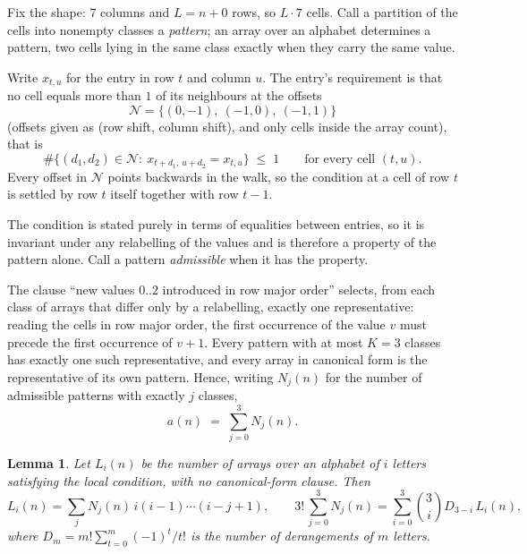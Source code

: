 \documentclass[11pt,a4paper]{article}
\theoremstyle{plain}
\newtheorem{lemma}[theorem]{Lemma}
\theoremstyle{definition}
\begin{document}
Fix the shape: $7$ columns and $L=n+0$ rows, so $L\cdot7$ cells. Call a
partition of the cells into nonempty classes a \emph{pattern}; an array over an alphabet
determines a pattern, two cells lying in the same class exactly when they carry the same
value.

Write $x_{t,u}$ for the entry in row $t$ and column $u$. The
entry's requirement is that no cell equals more than $1$ of its neighbours at the
offsets
\[
\mathcal N=\{(0,-1),\ (-1,0),\ (-1,1)\}
\]
(offsets given as (row shift, column shift), and only cells inside the array count),
that is
\begin{equation}\label{eq:loc}
\#\bigl\{(d_1,d_2)\in\mathcal N:\ x_{t+d_1,\,u+d_2}=x_{t,u}\bigr\}\;\le\;1
\qquad\text{for every cell }(t,u).
\end{equation}
Every offset in $\mathcal N$ points backwards in the walk, so the condition at a cell of
row $t$ is settled by row $t$ itself together with row $t-1$.

The condition is stated purely in terms of equalities between entries, so it is invariant
under any relabelling of the values and is therefore a property of the pattern alone. Call a
pattern \emph{admissible} when it has the property.

The clause ``new values $0..2$ introduced in row major order'' selects, from each class
of arrays that differ only by a relabelling, exactly one representative: reading the cells in
row major order, the first occurrence of the value $v$ must precede the first occurrence of
$v+1$. Every pattern with at most $K=3$ classes has exactly one such representative, and
every array in canonical form is the representative of its own pattern. Hence, writing
$N_j(n)$ for the number of admissible patterns with exactly $j$ classes,
\begin{equation}\label{eq:apat}
a(n)\;=\;\sum_{j=0}^{3}N_j(n).
\end{equation}

\begin{lemma}\label{lem:inv}
Let $L_i(n)$ be the number of arrays over an alphabet of $i$ letters satisfying the local
condition, with no canonical-form clause. Then
\[
L_i(n)=\sum_j N_j(n)\,i(i-1)\cdots(i-j+1),
\qquad
3!\,\sum_{j=0}^{3}N_j(n)=\sum_{i=0}^{3}\binom{3}{i}D_{3-i}\,L_i(n),
\]
where $D_m=m!\sum_{t=0}^{m}(-1)^t/t!$ is the number of derangements of $m$ letters.
\end{lemma}
\end{document}
